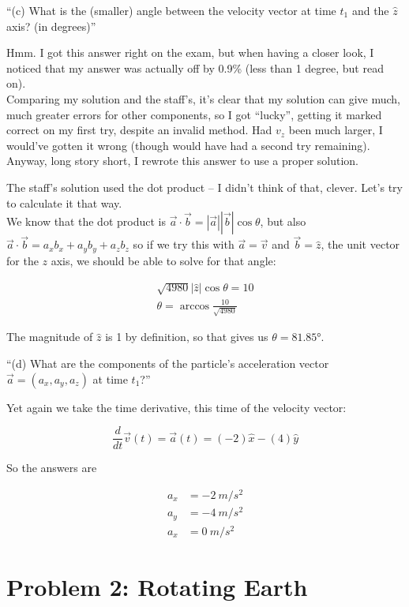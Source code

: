 \documentclass[8.01x]{subfiles}
\begin{document}
``(c) What is the (smaller) angle between the velocity vector at time $t_1$ and the $\hat{z}$ axis? (in degrees)''

Hmm. I got this answer right on the exam, but when having a closer look, I noticed that my answer was actually off by 0.9\% (less than 1 degree, but read on).\\
Comparing my solution and the staff's, it's clear that my solution can give much, much greater errors for other components, so I got ``lucky'', getting it marked correct on my first try, despite an invalid method. Had $v_z$ been much larger, I would've gotten it wrong (though would have had a second try remaining). Anyway, long story short, I rewrote this answer to use a proper solution.

The staff's solution used the dot product -- I didn't think of that, clever. Let's try to calculate it that way.\\
We know that the dot product is $\vec{a} \cdot \vec{b} = |\vec{a}| |\vec{b}| \cos \theta$, but also $\vec{a} \cdot \vec{b} = a_x b_x + a_y b_y + a_z b_z$ so if we try this with $\vec{a} = \vec{v}$ and $\vec{b} = \hat{z}$, the unit vector for the $z$ axis, we should be able to solve for that angle:

\begin{align}
\sqrt{4980} |\hat{z}| \cos \theta = 10\\
\theta = \arccos \frac{10}{\sqrt{4980}}
\end{align}

The magnitude of $\hat{z}$ is 1 by definition, so that gives us $\theta = \ang{81.85}$.

``(d) What are the components of the particle's acceleration vector $\vec{a} = (a_x,a_y,a_z)$ at time $t_1$?''

Yet again we take the time derivative, this time of the velocity vector:

\begin{equation}
\frac{d}{dt} \vec{v}(t) = \vec{a}(t) = (-2)\hat{x} - (4)\hat{y}
\end{equation}

So the answers are

\begin{align}
a_x &= \SI{-2}{m/s^2}\\
a_y &= \SI{-4}{m/s^2}\\
a_x &= \SI{0}{m/s^2}
\end{align}

\section{Problem 2: Rotating Earth}
\end{document}
